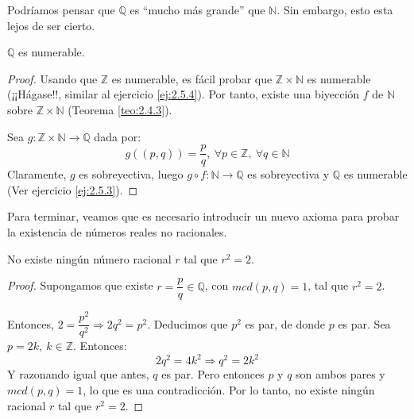 Podríamos pensar que $\mathbb{Q}$ es ``mucho más grande'' que $\mathbb{N}$. Sin embargo, esto esta lejos de ser cierto.
\begin{prop}
    $\mathbb{Q}$ es numerable.    
\end{prop}
\begin{proof}
    Usando que $\mathbb{Z}$ es numerable, es fácil probar que $\mathbb{Z} \times \mathbb{N}$ es numerable (¡¡Hágase!!, similar al ejercicio \ref{ej:2.5.4}).
    Por tanto, existe una biyección $f$ de $\mathbb{N}$ sobre $\mathbb{Z} \times \mathbb{N}$ (Teorema \ref{teo:2.4.3}).
    
    Sea $g: \mathbb{Z} \times \mathbb{N} \longrightarrow \mathbb{Q}$ dada por:
    \begin{equation*}
        g((p,q))=\frac{p}{q},~ \forall p \in \mathbb{Z},~ \forall q \in \mathbb{N}
    \end{equation*}
    Claramente, $g$ es sobreyectiva, luego $\displaystyle g \circ f : \mathbb{N} \longrightarrow \mathbb{Q}$ es sobreyectiva y
    $\mathbb{Q}$ es numerable (Ver ejercicio \ref{ej:2.5.3}). 
\end{proof}

Para terminar, veamos que es necesario introducir un nuevo axioma para probar la existencia de números reales no racionales.
\begin{prop}
    No existe ningún número racional $r$ tal que $r^2 = 2$.
\end{prop}
\begin{proof}
    Supongamos que existe $r=\dfrac{p}{q} \in \mathbb{Q}$, con $mcd(p,q)=1$, tal que $r^2 = 2$.
    
    Entonces, $2=\dfrac{p^2}{q^2} \Rightarrow  2 q^2 = p^2$. Deducimos que $p^2$ es par, de donde $p$ es par.
    Sea $p = 2k,~k \in \mathbb{Z}$. Entonces:
    \begin{equation*}
        2q^2 = 4k^2 \Longrightarrow q^2 = 2 k^2
    \end{equation*}
    Y razonando igual que antes, $q$ es par. Pero entonces $p$ y $q$ son ambos pares y $mcd(p,q)=1$, lo que es
    una contradicción. Por lo tanto, no existe ningún racional $r$ tal que $r^2 = 2$.
\end{proof}



